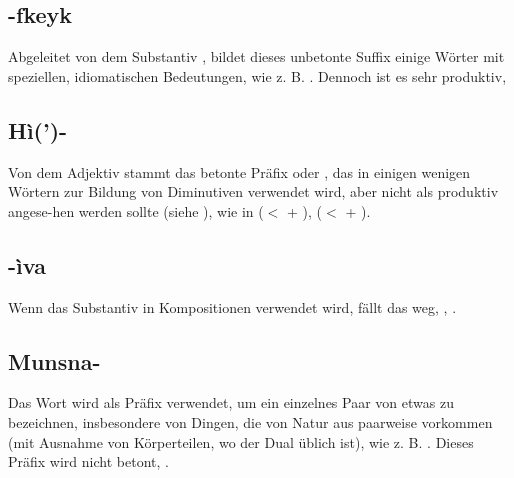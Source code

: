 \subsection{-fkeyk} Abgeleitet von dem Substantiv  , bildet dieses unbetonte Suffix einige Wörter mit speziellen, idiomatischen Bedeutungen, wie z. B.  . Dennoch ist es sehr produktiv,  

\subsection{Hì(')-} Von dem Adjektiv   stammt das betonte Präfix  oder , das in einigen wenigen Wörtern zur Bildung von Diminutiven verwendet wird, aber nicht als produktiv angese-hen werden sollte (siehe ), wie in   ($<$  +  ),   ($<$  +  ).

\subsection{-ìva} Wenn das Substantiv   in Kompositionen verwendet wird, fällt das  weg,  ,  .

\subsection{Munsna-} Das Wort   wird als Präfix verwendet, um ein einzelnes Paar von etwas zu bezeichnen, insbesondere von Dingen, die von Natur aus paarweise vorkommen (mit Ausnahme von Körperteilen, wo der Dual üblich ist), wie z. B.  . Dieses Präfix wird nicht betont,  .


